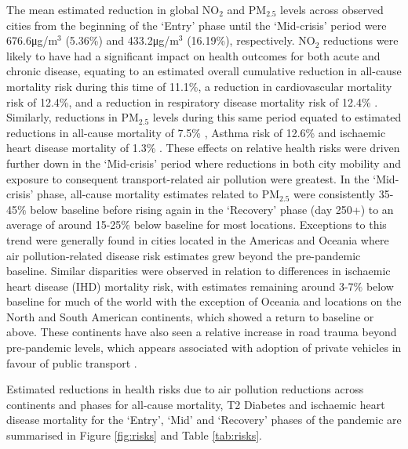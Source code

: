 \documentclass[preprint,10pt]{elsarticle} %
\begin{document}
The mean estimated reduction in global NO$_{2}$ and PM$_{2.5}$ levels across observed cities from the beginning of the `Entry' phase until the `Mid-crisis' period were 676.6\si{\micro\gram}/m$^{3}$ (5.36\%) and 433.2\si{\micro\gram}/m$^{3}$ (16.19\%), respectively. NO$_{2}$ reductions were likely to have had a significant impact on health outcomes for both acute and chronic disease, equating to an estimated overall cumulative reduction in all-cause mortality risk during this time of 11.1\%, a reduction in cardiovascular mortality risk of 12.4\%, and a reduction in respiratory disease mortality risk of 12.4\% \cite{Huang19Pollution}. Similarly, reductions in PM$_{2.5}$ levels during this same period equated to estimated reductions in all-cause mortality of 7.5\% \cite{Yu2020PM2.5}, Asthma risk of 12.6\% and ischaemic heart disease mortality of 1.3\% \cite{Xie257}. These effects on relative health risks were driven further down in the `Mid-crisis' period where reductions in both city mobility and exposure to consequent transport-related air pollution were greatest. In the `Mid-crisis' phase, all-cause mortality estimates related to PM$_{2.5}$ were consistently 35-45$\%$ below baseline before rising again in the `Recovery' phase (day 250+) to an average of around 15-25$\%$ below baseline for most locations. Exceptions to this trend were generally found in cities located in the Americas and Oceania where air pollution-related disease risk estimates grew beyond the pre-pandemic baseline. Similar disparities were observed in relation to differences in ischaemic heart disease (IHD) mortality risk, with estimates remaining around 3-7$\%$ below baseline for much of the world with the exception of Oceania and locations on the North and South American continents, which showed a return to baseline or above. These continents have also seen a relative increase in road trauma beyond pre-pandemic levels, which appears associated with adoption of private vehicles in favour of public transport \cite{ITFRS, saladie2023back, DAS20211}. 


Estimated reductions in health risks due to air pollution reductions across continents and phases for all-cause mortality, T2 Diabetes and ischaemic heart disease mortality for the `Entry', `Mid' and `Recovery' phases of the pandemic are summarised in Figure \ref{fig:risks} and Table \ref{tab:risks}. 
\end{document}
